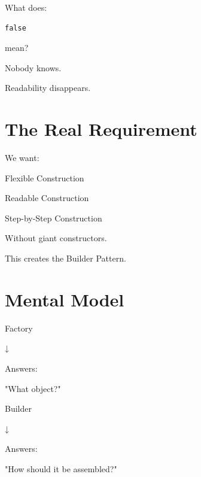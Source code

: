 \documentclass[11pt,a4paper]{book}
\begin{document}

What does:

\begin{verbatim}
false
\end{verbatim}

mean?


Nobody knows.


Readability disappears.


\section{The Real Requirement}

We want:


Flexible Construction


Readable Construction


Step-by-Step Construction


Without giant constructors.


This creates the Builder Pattern.


\section{Mental Model}

\begin{mentalmodel}

Factory

↓

Answers:

"What object?"

\vspace{0.5em}

Builder

↓

Answers:

"How should it be assembled?"

\end{mentalmodel}
\end{document}
